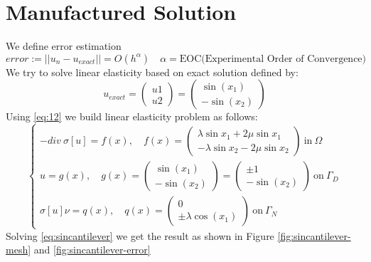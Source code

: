 \documentclass[a4paper,11pt]{article}
\begin{document}
\section{Manufactured Solution}
We define error estimation
\begin{equation}
error:=||u_n-u_{exact}|| = O(h^\alpha)\quad \alpha=\text{EOC(Experimental Order of Convergence)}
\end{equation}
We try to solve linear elasticity based on exact solution defined by:
\begin{equation}\label{eq:12}
u_{exact} = \begin{pmatrix}
u1\\
u2
\end{pmatrix} = \begin{pmatrix}
\sin(x_1)\\
-\sin(x_2)
\end{pmatrix}
\end{equation}
Using \eqref{eq:12} we build linear elasticity problem as follows:
\begin{equation}\label{eq:sincantilever}
\begin{cases}
-div\ \sigma[u]=f(x),\quad f(x)=\begin{pmatrix}
\lambda \sin x_1 + 2\mu \sin x_1\\
-\lambda \sin x_2 - 2\mu \sin x_2
\end{pmatrix}\ \text{in}\ \Omega\\

u=g(x),\quad g(x) = \begin{pmatrix}
\sin(x_1)\\
-\sin(x_2)
\end{pmatrix} = \begin{pmatrix}
\pm 1\\
-\sin(x_2)
\end{pmatrix}\ \text{on}\ \Gamma_D\\

\sigma[u] \nu = q(x), \quad q(x) = \begin{pmatrix}
0\\
\pm \lambda \cos(x_1)
\end{pmatrix}\ \text{on}\ \Gamma_N
\end{cases}
\end{equation}
Solving \eqref{eq:sincantilever} we get the result as shown in Figure \ref{fig:sincantilever-mesh} and \ref{fig:sincantilever-error}
\end{document}
